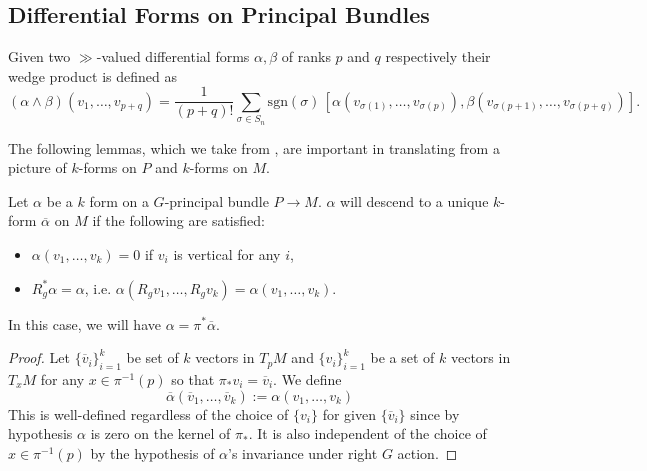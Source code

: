 		\subsection{Differential Forms on Principal Bundles}

		\begin{defn}
			Given two $\gg$-valued differential forms $\alpha, \beta$ of ranks $p$ and $q$ respectively their wedge product is defined as
						\[
							(\alpha \wedge \beta)(v_1, \dots, v_{p+q}) = \frac{1}{(p+q)!} \sum_{\sigma \in S_n} \mathrm{sgn}(\sigma)\, [\alpha(v_{\sigma(1)}, \dots, v_{\sigma(p)}), \beta(v_{\sigma(p+1)}, \dots, v_{\sigma(p+q)})].
						\]
		\label{defn:wedgeforms}
		\end{defn}
		
		
		The following lemmas, which we take from \cite{kobayashi1963}, are important in translating from a picture of $k$-forms on $P$ and $k$-forms on $M$.
		\begin{lemma}
			Let $\alpha$ be a $k$ form on a $G$-principal bundle $P \to M$. $\alpha$ will descend to a unique $k$-form $\overline \alpha$ on $M$ if the following are satisfied:
			\begin{itemize}
				\item $\alpha(v_1, \dots, v_k) = 0$ if $v_i$ is vertical for any $i$,
				\item $R_g^* \alpha = \alpha$, i.e. $\alpha(R_g v_1, \dots, R_g v_k)=\alpha(v_1, \dots, v_k)$.
			\end{itemize}
			In this case, we will have $\alpha = \pi^* \overline \alpha$.
			\label{lem:pushdown1}
		\end{lemma}
		\begin{proof}
			Let $\{\overline v_i\}_{i=1}^k$ be set of $k$ vectors in $T_p M$ and $\{v_i\}_{i=1}^k$ be a set of $k$ vectors in $T_x M$ for any $x \in \pi^{-1} (p)$ so that $\pi_* v_i = \overline v_i$. We define
			\[
				\overline \alpha(\overline v_1, \dots, \overline v_k) := \alpha(v_1, \dots, v_k)
			\]
			This is well-defined regardless of the choice of $\{v_i\}$ for given $\{\overline v_i\}$ since by hypothesis $\alpha$ is zero on the kernel of $\pi_*$. It is also independent of the choice of $x \in \pi^{-1}(p)$ by the hypothesis of $\alpha$'s invariance under right $G$ action.
		\end{proof}
		
